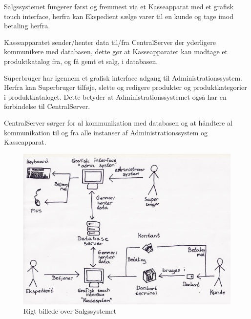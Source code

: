 Salgssystemet fungerer først og fremmest via et Kasseapparat med et grafisk touch interface, herfra kan Ekspedient sælge varer til en kunde og tage imod betaling herfra. 

Kasseapparatet sender/henter data til/fra CentralServer der yderligere kommunikere med databasen, dette gør at Kasseapparatet kan modtage et produktkatalog fra, og få gemt et salg, i databasen. 

Superbruger har igennem et grafisk interface adgang til Administrationssystem. Herfra kan Superbruger tilføje, slette og redigere produkter og produktkategorier i produktkataloget. Dette betyder at Administrationssystemet også har en forbindelse til CentralServer.

CentralServer sørger for al kommunikation med databasen og at håndtere al kommunikation til og fra alle instanser af Administrationssystem og Kasseapparat.


\begin{figure}[!h]
    \centering
    \includegraphics[width=1.0\textwidth]{Systembeskrivelse/RigtBillede2.jpg}
    \caption{Rigt billede over Salgssystemet}
    \label{fig:Rigtbill}
\end{figure}
